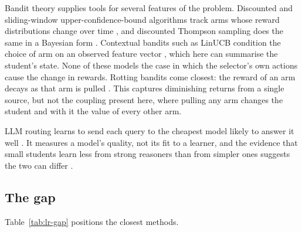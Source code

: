 Bandit theory supplies tools for several features of the problem. Discounted and
sliding-window upper-confidence-bound algorithms track arms whose reward distributions
change over time \autocite{garivier_ducb_2011}, and discounted Thompson sampling does
the same in a Bayesian form \autocite{raj_dts_2017}. Contextual bandits such as LinUCB
condition the choice of arm on an observed feature vector \autocite{li_linucb_2010},
which here can summarise the student's state. None of these models the case in which
the selector's own actions cause the change in rewards. Rotting bandits come closest:
the reward of an arm decays as that arm is pulled \autocite{levine_rotting_2017}. This
captures diminishing returns from a single source, but not the coupling present here,
where pulling any arm changes the student and with it the value of every other arm.

LLM routing learns to send each query to the cheapest model likely to answer it well
\autocite{ong_routellm_2025}. It measures a model's quality, not its fit to a learner,
and the evidence that small students learn less from strong reasoners than from simpler
ones suggests the two can differ \autocite{li_learnability_gap_2025}.

\subsection{The gap}
\label{sec:lr-gap}

Table~\ref{tab:lr-gap} positions the closest methods.

